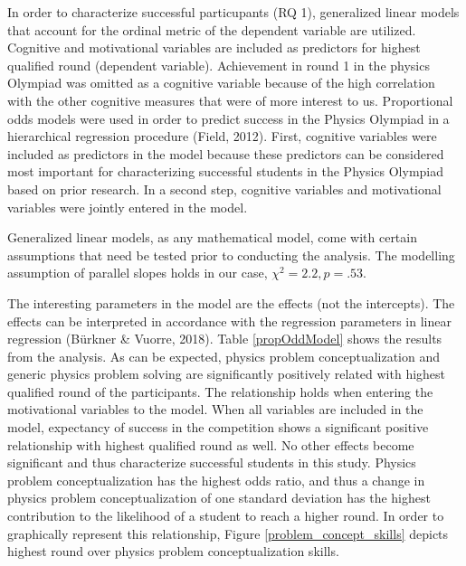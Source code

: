 \documentclass[D:/studies/WinnerS/Erhebungen/IPhO1718/paper/problem_solving/main/TaylorFrancis/interactapasample]{subfiles}
\begin{document}
In order to characterize successful particupants (RQ 1), generalized linear models that account for the ordinal metric of the dependent variable are utilized. Cognitive and motivational variables are included as predictors for highest qualified round (dependent variable). Achievement in round 1 in the physics Olympiad was omitted as a cognitive variable because of the high correlation with the other cognitive measures that were of more interest to us. Proportional odds models were used in order to predict success in the Physics Olympiad in a hierarchical regression procedure (Field, 2012). First, cognitive variables were included as predictors in the model because these predictors can be considered most important for characterizing successful students in the Physics Olympiad based on prior research. In a second step, cognitive variables and motivational variables were jointly entered in the model.

Generalized linear models, as any mathematical model, come with certain assumptions that need be tested prior to conducting the analysis. The modelling assumption of parallel slopes holds in our case, $\chi^2=2.2, p=.53$. 

The interesting parameters in the model are the effects (not the intercepts). The effects can be interpreted in accordance with the regression parameters in linear regression (B\"u{}rkner \& Vuorre, 2018). Table \ref{propOddModel} shows the results from the analysis. As can be expected, physics problem conceptualization and generic physics problem solving are significantly positively related with highest qualified round of the participants. The relationship holds when entering the motivational variables to the model. When all variables are included in the model, expectancy of success in the competition shows a significant positive relationship with highest qualified round as well. No other effects become significant and thus characterize successful students in this study. Physics problem conceptualization has the highest odds ratio, and thus a change in physics problem conceptualization of one standard deviation has the highest contribution to the likelihood of a student to reach a higher round. In order to graphically represent this relationship, Figure \ref{problem_concept_skills} depicts highest round over physics problem conceptualization skills.
\end{document}
